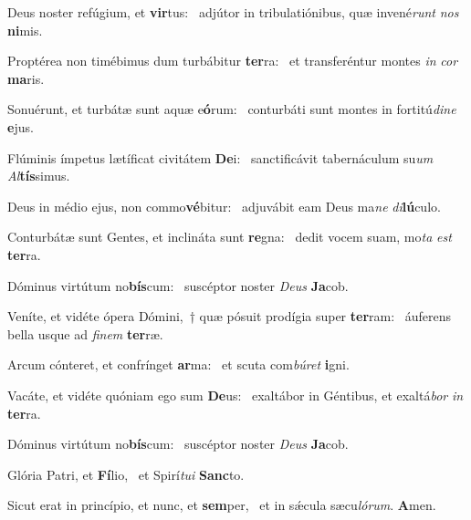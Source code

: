 \item Deus noster refúgium, et \textbf{vir}tus:~\psstar{} adjútor in tribulatiónibus, quæ invené\textit{runt} \textit{nos} \textbf{ni}mis.
\item Proptérea non timébimus dum turbábitur \textbf{ter}ra:~\psstar{} et transferéntur montes \textit{in} \textit{cor} \textbf{ma}ris.
\item Sonuérunt, et turbátæ sunt aquæ e\textbf{ó}rum:~\psstar{} conturbáti sunt montes in fortitú\textit{dine} \textbf{e}jus.
\item Flúminis ímpetus lætíficat civitátem \textbf{De}i:~\psstar{} sanctificávit tabernáculum su\textit{um} \textit{Al}\textbf{tís}simus.
\item Deus in médio ejus, non commo\textbf{vé}bitur:~\psstar{} adjuvábit eam Deus ma\textit{ne} \textit{di}\textbf{lú}culo.
\item Conturbátæ sunt Gentes, et inclináta sunt \textbf{re}gna:~\psstar{} dedit vocem suam, mo\textit{ta} \textit{est} \textbf{ter}ra.
\item Dóminus virtútum no\textbf{bís}cum:~\psstar{} suscéptor noster \textit{Deus} \textbf{Ja}cob.
\item Veníte, et vidéte ópera Dómini,~† quæ pósuit prodígia super \textbf{ter}ram:~\psstar{} áuferens bella usque ad \textit{finem} \textbf{ter}ræ.
\item Arcum cónteret, et confrínget \textbf{ar}ma:~\psstar{} et scuta com\textit{búret} \textbf{i}gni.
\item Vacáte, et vidéte quóniam ego sum \textbf{De}us:~\psstar{} exaltábor in Géntibus, et exaltá\textit{bor} \textit{in} \textbf{ter}ra.
\item Dóminus virtútum no\textbf{bís}cum:~\psstar{} suscéptor noster \textit{Deus} \textbf{Ja}cob.
\item Glória Patri, et \textbf{Fí}lio,~\psstar{} et Spirí\textit{tui} \textbf{Sanc}to.
\item Sicut erat in princípio, et nunc, et \textbf{sem}per,~\psstar{} et in sǽcula sæcu\textit{lórum}. \textbf{A}men.
